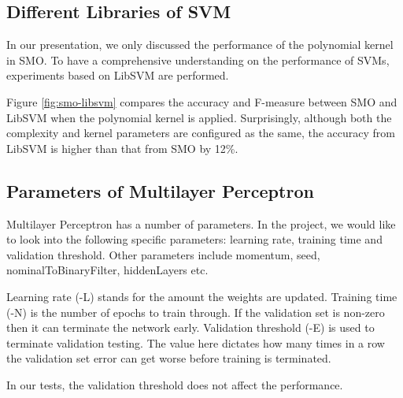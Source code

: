 \documentclass[11pt]{article}
\begin{document}
\subsection{Different Libraries of SVM}

In our presentation, we only discussed the performance of the polynomial kernel in SMO. To have a comprehensive understanding on the performance of SVMs, experiments based on LibSVM are performed.

Figure \ref{fig:smo-libsvm} compares the accuracy and F-measure between SMO and LibSVM when the polynomial kernel is applied. Surprisingly, although both the complexity and kernel parameters are configured as the same, the accuracy from LibSVM is higher than that from SMO by 12\%. 



\subsection{Parameters of Multilayer Perceptron}
Multilayer Perceptron has a number of parameters. In the project, we would like to look into the following specific parameters: learning rate, training time and validation threshold. Other parameters include momentum, seed, nominalToBinaryFilter, hiddenLayers etc.

Learning rate (-L) stands for the amount the weights are updated. Training time (-N) is the number of epochs to train through. If the validation set is non-zero then it can terminate the network early. Validation threshold (-E) is used to terminate validation testing. The value here dictates how many times in a row the validation set error can get worse before training is terminated.

In our tests, the validation threshold does not affect the performance.
 
\end{document}
